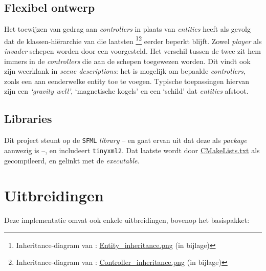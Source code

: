 \documentclass[10pt,a4paper]{article}
\begin{document}
\subsection{Flexibel ontwerp}
Het toewijzen van gedrag aan \emph{controllers} in plaats van 
\emph{entities} heeft als gevolg dat de klassen-hi\"erarchie van 
die laatsten
\footnote{Inheritance-diagram van : \url{Entity_inheritance.png} (in bijlage)}\footnote{Inheritance-diagram van : \url{Controller_inheritance.png} (in bijlage)}
 eerder beperkt blijft. Zowel \emph{player} als \emph{invader}
schepen worden door een  voorgesteld. 
Het verschil tussen de twee zit hem immers in de \emph{controllers} die aan 
de schepen toegewezen worden. Dit vindt ook zijn weerklank in 
\emph{scene descriptions}: het is mogelijk om bepaalde \emph{controllers}, 
zoals een  aan eenderwelke entity toe te 
voegen. Typische toepassingen hiervan zijn een 
\emph{`gravity well'}, `magnetische kogels' en een `schild' dat 
\emph{entities} afstoot.

\subsection{Libraries}
Dit project steunt op de \texttt{SFML} \emph{library} -- en gaat ervan uit
dat deze als \emph{package} aanwezig is --, en includeert 
\texttt{tinyxml2}. Dat laatste wordt door \url{CMakeLists.txt} als 
gecompileerd, en gelinkt met de \emph{executable}.

\section{Uitbreidingen}

Deze implementatie omvat ook enkele uitbreidingen, bovenop het basispakket:
\end{document}
